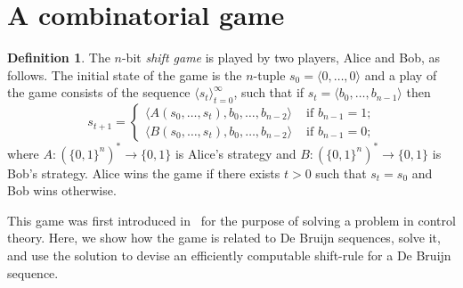 \documentclass[final,12pt]{elsarticle}
\theoremstyle{definition} \newtheorem{definition}[theorem]{Definition} \newtheorem{observation}[theorem]{Observation} \newtheorem{example}[theorem]{Example} \newtheorem{remark}[theorem]{Remark} \newtheorem{corrolary}[theorem]{Corrolary}
\newcommand{\T}[1]{\langle{#1}\rangle} \DeclareMathOperator{\drop}{drop} \DeclareMathOperator{\dropbits}{drop\_bits} \DeclareMathOperator{\dropstates}{drop\_states} \DeclareMathOperator{\leadingForm}{LeadingForm} \DeclareMathOperator{\dv}{div} %
\begin{document}
\section{A combinatorial game}
\label{sec:game}

\begin{definition}
	\label{Def:shift game} The $n$-bit
	\emph{shift game} is played by two players, Alice and Bob, as follows. The initial state of the game is the $n$-tuple $s_0=\T{0,\dots,0}$ and a play of the game consists of the sequence $\T{s_t }_{t=0}^\infty$, such that if $s_t=\T{b_0, \dots, b_{n-1}}$ then 
		$$s_{t+1} =
		\begin{cases}
			\T{ A(s_0,\dots,s_t), b_0, \dots, b_{n-2}} &
			\text{ if $b_{n-1} = 1$;}      \\
			\T{ B(s_0,\dots,s_t), b_0, \dots, b_{n-2}} &
			\text{ if $b_{n-1} = 0$;}
		\end{cases}$$ where $A \colon(\{0,1\}^n)^* \to \{0,1\}$ is Alice's strategy and $B\colon (\{0,1\}^n)^* \to \{0,1\}$ is Bob's strategy. Alice wins the game if there exists $t>0$ such that $s_t=s_0$ and Bob wins otherwise.
\end{definition}

This game was first introduced in~\cite{weiss2007combinatorial} for the purpose of solving a problem in control theory. Here, we show how the game is related to De Bruijn sequences, solve it, and use the solution to devise an efficiently computable shift-rule for a De Bruijn sequence. 
\end{document}
